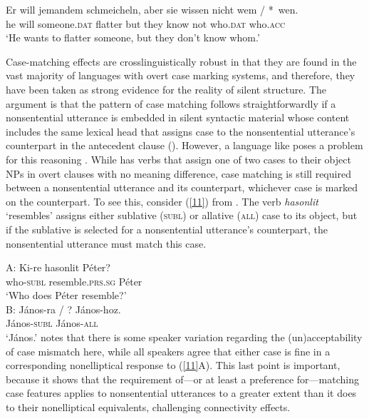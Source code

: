 \ea
\gll Er will jemandem schmeicheln, aber sie wissen nicht wem / *~wen.\\
     he will someone.\textsc{dat} flatter but they know not who.\textsc{dat} {}  \hphantom{*~}who.\textsc{acc}\\
\glt `He wants to flatter someone, but they don't know whom.'\label{10}\z


Case-matching effects are crosslinguistically robust in that they are found in the vast majority of
languages with overt case marking systems, and therefore, they have been taken as strong evidence
for the reality of silent structure. The argument is that the pattern of case matching follows
straightforwardly if a nonsentential utterance is embedded in silent syntactic material whose
content includes the same lexical head that assigns case to the nonsentential utterance's
counterpart in the antecedent clause (\citealt{Merchant2001, Merchant2005a}). However, a language
like  poses a problem for this reasoning \citep{Jacobson2016}. While 
has verbs that assign one of two cases to their object NPs in overt clauses with no meaning
difference, case matching is still required between a nonsentential utterance and its counterpart,
whichever case is marked on the counterpart. To see this, consider (\ref{11}) from
\citet[356]{Jacobson2016}. The verb \emph{hasonlit} `resembles' assigns either sublative
(\textsc{subl}) or allative (\textsc{all}) case to its object, but if the sublative is selected for
a nonsentential utterance's counterpart, the nonsentential utterance must match this case.

\ea
A: \gll Ki-re             hasonlit         Péter?\\
        who-\textsc{subl} resemble.\textsc{prs}.\textsc{sg}  Péter\\
\glt  \hphantom{A:~}`Who does Péter resemble?'\\
B: \gll J\'{a}nos-ra / ? J\'{a}nos-hoz.\\
        J\'{a}nos-\textsc{subl} {} {} J\'{a}nos-\textsc{all}\\
\glt  \hphantom{B:~}`J\'{a}nos.'\label{11}
\z
%
\citet{Jacobson2016} notes that there is some speaker variation regarding the
(un)ac\-cepta\-bi\-li\-ty of case mismatch here, while all speakers agree that either case is fine
in a corresponding nonelliptical response to (\ref{11}A). This last point is important, because it
shows that the requirement of---or at least a preference for---matching case features applies to
nonsentential utterances to a greater extent than it does to their nonelliptical equivalents,
challenging connectivity effects.

